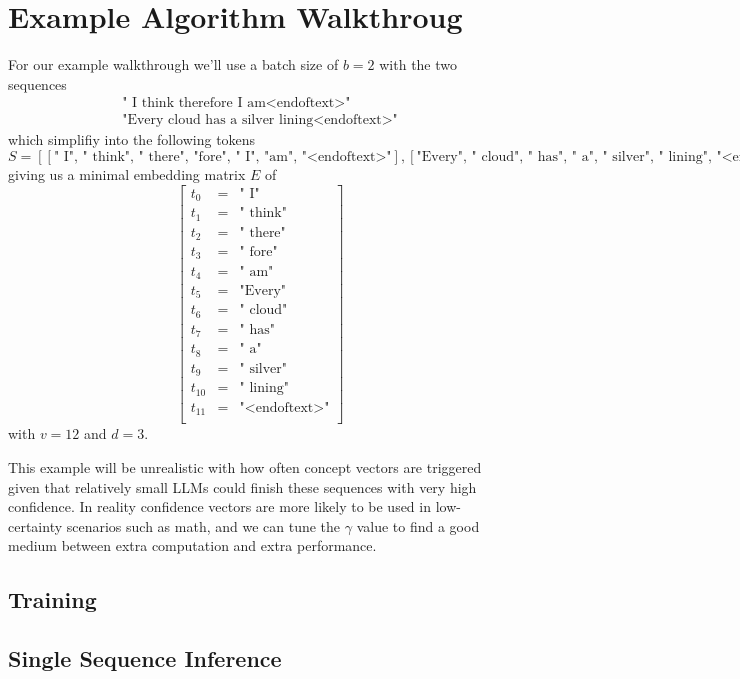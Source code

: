 \documentclass{article}
\begin{document}
\section{Example Algorithm Walkthroug}
\label{sec:example}
For our example walkthrough we'll use a batch size of $b=2$ with the two sequences
$$\begin{matrix}
    \text{" I think therefore I am<endoftext>"} \\
    \text{"Every cloud has a silver lining<endoftext>"}
\end{matrix}$$
which simplifiy into the following tokens
$$S = 
[[\text{" I", " think", " there", "fore", " I", "am", "<endoftext>"}],
[\text{"Every", " cloud", " has", " a", " silver", " lining", "<endoftext>"}]]$$
giving us a minimal embedding matrix $E$ of
$$\begin{bmatrix}
    t_0 & = & \text{" I"}\\
    t_1 & = & \text{" think"}\\
    t_2 & = & \text{" there"}\\
    t_3 & = & \text{" fore"}\\
    t_4 & = & \text{" am"}\\
    t_5 & = & \text{"Every"}\\
    t_6 & = & \text{" cloud"}\\
    t_7 & = & \text{" has"}\\
    t_8 & = & \text{" a"}\\
    t_9 & = & \text{" silver"}\\
    t_{10} & = & \text{" lining"}\\
    t_{11} & = & \text{"<endoftext>"}\\
\end{bmatrix}$$
with $v=12$ and $d=3$.\par

This example will be unrealistic with how often concept vectors are triggered given that relatively small LLMs could finish these sequences with very high confidence.
In reality confidence vectors are more likely to be used in low-certainty scenarios such as math, and we can tune the $\gamma$ value to find a good medium between extra computation and extra performance.

\subsection{Training}



\subsection{Single Sequence Inference}
\end{document}
